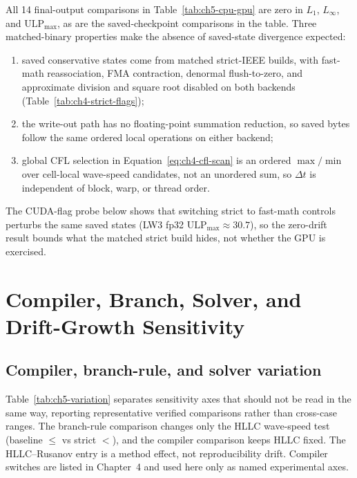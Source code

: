 All 14 final-output comparisons in Table~\ref{tab:ch5-cpu-gpu} are zero in
\(L_1\), \(L_\infty\), and \(\mathrm{ULP}_{\max}\), as are the
saved-checkpoint comparisons in the table. Three matched-binary
properties make the absence of saved-state divergence expected:
\begin{enumerate}
  \item saved conservative states come from matched strict-IEEE builds, with
        fast-math reassociation, FMA contraction, denormal flush-to-zero, and
        approximate division and square root disabled on both backends
        (Table~\ref{tab:ch4-strict-flags});
  \item the write-out path has no floating-point summation reduction, so saved
        bytes follow the same ordered local operations on either backend;
  \item global CFL selection in Equation~\ref{eq:ch4-cfl-scan} is an ordered
        \(\max/\min\) over cell-local wave-speed candidates, not an unordered
        sum, so \(\Delta t\) is independent of block, warp, or thread order.
\end{enumerate}
The CUDA-flag probe below shows that switching strict to fast-math controls perturbs the same saved states (LW3 fp32 \(\mathrm{ULP}_{\max}\approx 30.7\)), so the zero-drift result bounds what the matched strict build hides, not whether the GPU is exercised.


\section{Compiler, Branch, Solver, and Drift-Growth Sensitivity}
\subsection*{Compiler, branch-rule, and solver variation}

Table~\ref{tab:ch5-variation} separates sensitivity axes that should not be
read in the same way, reporting representative verified comparisons rather
than cross-case ranges. The branch-rule comparison changes only the HLLC
wave-speed test (baseline $\leq$ vs strict $<$), and the compiler comparison
keeps HLLC fixed. The HLLC--Rusanov entry is a method effect, not
reproducibility drift. Compiler switches are listed in Chapter~4 and used
here only as named experimental axes.

